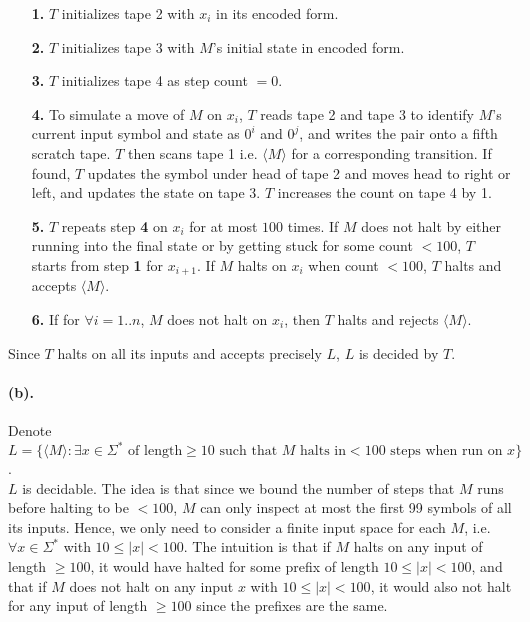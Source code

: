 \documentclass[12pt]{article}
\begin{document}
\begin{enumerate}
  \item[\textbf{1.}] \(T\) initializes tape 2 with \(x_i\) in its encoded form.
  \item[\textbf{2.}] \(T\) initializes tape 3 with \(M\)'s initial state in encoded form.
  \item[\textbf{3.}] \(T\) initializes tape 4 as step count \(= 0\).
  \item[\textbf{4.}] To simulate a move of \(M\) on \(x_i\), \(T\) reads tape 2 and tape 3 to identify \(M\)'s current input symbol and state as \(0^i\) and \(0^j\), and writes the pair onto a fifth scratch tape. \(T\) then scans tape 1 i.e. \(\langle M \rangle\) for a corresponding transition. If found, \(T\) updates the symbol under head of tape 2 and moves head to right or left, and updates the state on tape 3. \(T\) increases the count on tape 4 by 1. 
  \item[\textbf{5.}] \(T\) repeats step \textbf{4} on \(x_i\) for at most \(100\) times. If \(M\) does not halt by either running into the final state or by getting stuck for some count \(< 100\), \(T\) starts from step \textbf{1} for \(x_{i+1}\). If \(M\) halts on \(x_i\) when count \(< 100\), \(T\) halts and accepts \(\langle M \rangle\). 
  \item[\textbf{6.}] If for \(\forall i = 1 .. n\), \(M\) does not halt on \(x_i\), then \(T\) halts and rejects \(\langle M \rangle\).
\end{enumerate}
Since \(T\) halts on all its inputs and accepts precisely \(L\), \(L\) is decided by \(T\).

\paragraph*{(b).} Denote \(L = \{\langle M \rangle : \exists x \in \Sigma^* \text{ of length} \geq 10 \text{ such that } M \text{ halts in} < 100 \text{ steps when run on } x\}\).\\
\(L\) is decidable. The idea is that since we bound the number of steps that \(M\) runs before halting to be \(< 100\), \(M\) can only inspect at most the first 99 symbols of all its inputs. Hence, we only need to consider a finite input space for each \(M\), i.e. \(\forall x \in \Sigma^*\) with \(10 \leq |x| < 100\). The intuition is that if \(M\) halts on any input of length \(\geq 100\), it would have halted for some prefix of length \(10 \leq |x| < 100\), and that if \(M\) does not halt on any input \(x\) with \(10 \leq |x| < 100\), it would also not halt for any input of length \(\geq 100\) since the prefixes are the same.
\end{document}
